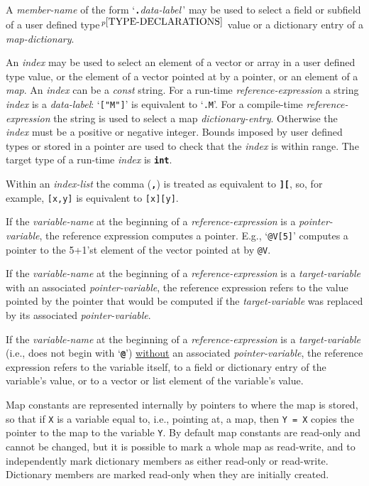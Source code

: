 \documentclass[12pt]{article}
\newcommand{\TT}[1]{{\tt \bfseries #1}}
\newcommand{\pagnote}[1]{$\,^{p\pageref{#1}}$}
\begin{document}
A {\em member-name} of the form `\TT{.}{\em data-label}\,'
may be used to select a field or subfield\label{FIELD-SELECTION}
of a user defined type\pagnote{TYPE-DECLARATIONS} value or
a dictionary entry of a {\em map-dictionary}.

An {\em index} may be used to select an element of a vector
or array in a
user defined type value, or the
element of a vector pointed at by a pointer, or an element
of a {\em map}.  An {\em index} can be a {\em const}
string.  For a run-time {\em reference-expression} a string
{\em index} is a {\em data-label}: `{\tt ["M"]}' is equivalent
to `{\tt .M}'.  For a compile-time {\em reference-expression}
the string is used to select a map {\em dictionary-entry}.
Otherwise the
{\em index} must be a positive or negative integer.  Bounds imposed
by user defined types or stored in a pointer are used to
check that the {\em index} is within range.
The target type of a run-time {\em index} is \TT{int}.


Within an {\em index-list} the comma (\TT{,}) is treated
as equivalent to \TT{][}, so, for example, {\tt [x,y]}
is equivalent to {\tt [x][y]}.

If the {\em variable-name} at the beginning of a {\em reference-expression}
is a {\em pointer-variable}, the reference expression computes a pointer.
E.g., `{\tt @V[5]}' computes a pointer to the 5+1'st element of the
vector pointed at by {\tt @V}.

If the {\em variable-name} at the beginning of a {\em reference-expression}
is a {\em target-variable} with an associated {\em pointer-variable},
the reference expression refers to the value pointed by the pointer
that would be computed if the {\em target-variable} was replaced by
its associated {\em pointer-variable}.

If the {\em variable-name} at the beginning of a {\em reference-expression}
is a {\em target-variable} (i.e., does not begin with `\TT{@}')
\underline{without}
an associated {\em pointer-variable},
the reference expression refers to the variable itself,
to a field or dictionary entry of the variable's value,
or to a vector or list element of the variable's value.

Map constants are represented internally by pointers to where
the map is stored, so that if {\tt X} is a variable equal to,
i.e., pointing at, a map, then {\tt Y = X} copies the pointer
to the map to the variable {\tt Y}.  By default map constants
are read-only and cannot be changed, but it is possible to mark
a whole map as read-write, and to independently mark dictionary members
as either read-only or read-write.
Dictionary members are marked read-only when they are initially created.
\end{document}
